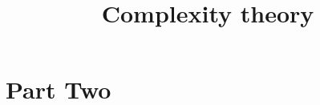 



\title{Complexity theory}


\maketitle

\label{section-phantom}

\tableofcontents


\part{Part Two}
\label{part-two}







